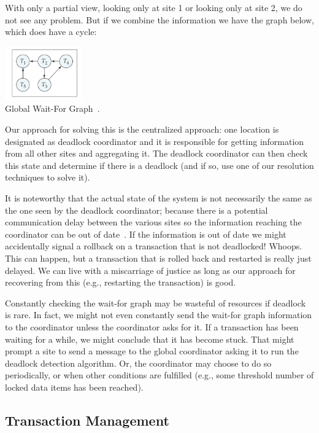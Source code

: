With only a partial view, looking only at site 1 or looking only at site 2, we do not see any problem. But if we combine the information we have the graph below, which does have a cycle:

\begin{center}
\includegraphics[width=0.25\textwidth]{images/waitfor-global}\\
Global Wait-For Graph~\cite{dsc}.
\end{center}

Our approach for solving this is the centralized approach: one location is designated as deadlock coordinator and it is responsible for getting information from all other sites and aggregating it. The deadlock coordinator can then check this state and determine if there is a deadlock (and if so, use one of our resolution techniques to solve it).

It is noteworthy that the actual state of the system is not necessarily the same as the one seen by the deadlock coordinator; because there is a potential communication delay between the various sites so the information reaching the coordinator can be out of date~\cite{dsc}. If the information is out of date we might accidentally signal a rollback on a transaction that is not deadlocked! Whoops. This can happen, but a transaction that is rolled back and restarted is really just delayed. We can live with a miscarriage of justice as long as our approach for recovering from this (e.g., restarting the transaction) is good.

Constantly checking the wait-for graph may be wasteful of resources if deadlock is rare. In fact, we might not even constantly send the wait-for graph information to the coordinator unless the coordinator asks for it. If a transaction has been waiting for a while, we might conclude that it has become stuck. That might prompt a site to send a message to the global coordinator asking it to run the deadlock detection algorithm. Or, the coordinator may choose to do so periodically, or when other conditions are fulfilled (e.g., some threshold number of locked data items has been reached). 

\subsection*{Transaction Management}

